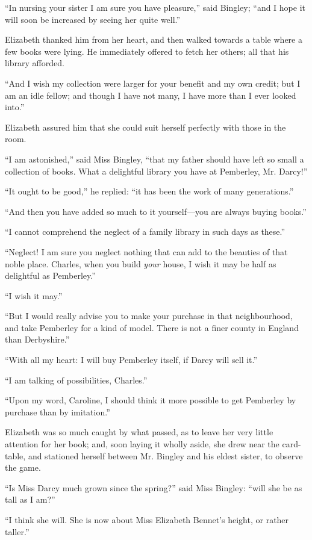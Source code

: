 ``In nursing your sister I am sure you have pleasure,'' said Bingley; ``and I hope it will soon be increased by seeing her quite well.''

Elizabeth thanked him from her heart, and then walked towards a table where a few books were lying. He immediately offered to fetch her others; all that his library afforded.

``And I wish my collection were larger for your benefit and my own credit; but I am an idle fellow; and though I have not many, I have more than I ever looked into.''

Elizabeth assured him that she could suit herself perfectly with those in the room.

``I am astonished,'' said Miss Bingley, ``that my father should have left so small a collection of books. What a delightful library you have at Pemberley, Mr. Darcy!''

``It ought to be good,'' he replied: ``it has been the work of many generations.''

``And then you have added so much to it yourself---you are always buying books.''

``I cannot comprehend the neglect of a family library in such days as these.''

``Neglect! I am sure you neglect nothing that can add to the beauties of that noble place. Charles, when you build \textit{your} house, I wish it may be half as delightful as Pemberley.''

``I wish it may.''

``But I would really advise you to make your purchase in that neighbourhood, and take Pemberley for a kind of model. There is not a finer county in England than Derbyshire.''

``With all my heart: I will buy Pemberley itself, if Darcy will sell it.''

``I am talking of possibilities, Charles.''

``Upon my word, Caroline, I should think it more possible to get Pemberley by purchase than by imitation.''

Elizabeth was so much caught by what passed, as to leave her very little attention for her book; and, soon laying it wholly aside, she drew near the card-table, and stationed herself between Mr. Bingley and his eldest sister, to observe the game.

``Is Miss Darcy much grown since the spring?'' said Miss Bingley: ``will she be as tall as I am?''

``I think she will. She is now about Miss Elizabeth Bennet's height, or rather taller.''

